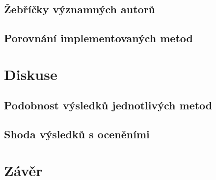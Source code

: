 \documentclass[12pt]{article}
\begin{document}
\subsection{Žebříčky významných autorů}

\subsection{Porovnání implementovaných metod}

\section{Diskuse}
\subsection{Podobnost výsledků jednotlivých metod}

\subsection{Shoda výsledků s oceněními}

\section{Závěr}



\end{document}
